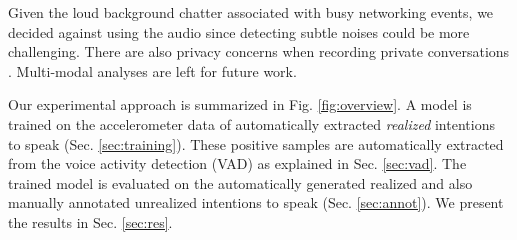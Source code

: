 \documentclass[sigconf]{acmart}
\begin{document}
Given the loud background chatter associated with busy networking events, we decided against using the audio since detecting subtle noises could be more challenging. There are also privacy concerns when recording private conversations \cite{raman2022conflab,MnM2021_underline}. Multi-modal analyses are left for future work. 
% 

Our experimental approach is summarized in Fig. \ref{fig:overview}. A model is trained on the accelerometer data of automatically extracted \emph{realized} intentions to speak (Sec. \ref{sec:training}). These positive samples are automatically extracted from the voice activity detection (VAD) as explained in Sec. \ref{sec:vad}. The trained model is evaluated on the automatically generated realized and also manually annotated unrealized intentions to speak (Sec. \ref{sec:annot}). We present the results in Sec. \ref{sec:res}.
\end{document}
